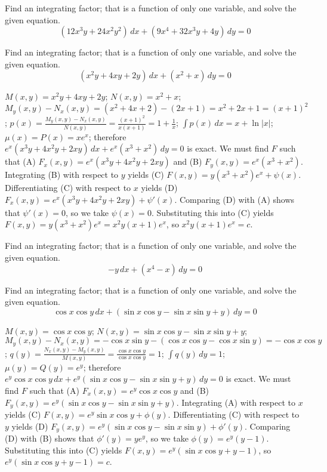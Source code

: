 \documentclass{ximera}
\begin{document}
\begin{problem}\label{exer:2.6.11} Find an integrating factor; that is a function of only one variable, and solve the given equation.
$$(12x^3y+24x^2y^2)\,dx+(9x^4+32x^3y+4y)\,dy=0$$
\end{problem}

\begin{problem}\label{exer:2.6.12} Find an integrating factor; that is a function of only one variable, and solve the given equation.
$$(x^2y+4xy+2y)\,dx+(x^2+x)\,dy=0$$



\begin{solution}
    $M(x,y)=x^2y+4xy+2y$;\;
$N(x,y)=x^2+x$;\;
$M_y(x,y)-N_x(x,y)=(x^2+4x+2)-(2x+1)=x^2+2x+1=(x+1)^2$;\;
$p(x)=\frac{M_y(x,y)-N_x(x,y)}{ N(x,y)}=\frac{(x+1)^2}{
x(x+1)}=1+\frac{1}{ x}$;\;
$\int p(x)\,dx=x+\ln|x|$;\;
$\mu(x)=P(x)=xe^x$;
therefore
$e^x(x^3y+4x^2y+2xy)\,dx+e^x(x^3+x^2)\,dy=0$
is exact.
We must find $F$ such that
(A) $F_x(x,y)=e^x(x^3y+4x^2y+2xy)$ and
(B) $F_y(x,y)=e^x(x^3+x^2)$.
Integrating (B) with respect to $y$ yields
(C) $F(x,y)=y(x^3+x^2)e^x+\psi(x)$.
Differentiating (C) with respect to $x$  yields
(D) $F_x(x,y)=e^x(x^3y+4x^2y+2xy)+\psi'(x)$.
Comparing (D) with (A)  shows that
$\psi'(x)=0$, so we take
$\psi(x)=0$.
Substituting this into (C) yields
$F(x,y)=y(x^3+x^2)e^x=x^2y(x+1)e^x$,
so $x^2y(x+1)e^x=c$.
\end{solution}
\end{problem}

\begin{problem}\label{exer:2.6.13} Find an integrating factor; that is a function of only one variable, and solve the given equation.
$$-y\,dx+(x^4-x)\,dy=0$$
\end{problem}

\begin{problem}\label{exer:2.6.14} Find an integrating factor; that is a function of only one variable, and solve the given equation.
$$\cos x\cos y\,dx+(\sin x\cos y-\sin x\sin y+y)\,dy=0$$



\begin{solution}
    $M(x,y)=\cos x\cos y$;\;
$N(x,y)=\sin x\cos y-\sin x\sin y+y$;\;
$M_y(x,y)-N_x(x,y)=-\cos x\sin y-(\cos x\cos y-\cos x\sin y)
=-\cos x\cos y$;\;
$q(y)=\frac{N_x(x,y)-M_y(x,y)}{ M(x,y)}=\frac{\cos x\cos y
}{\cos x\cos y}=1$;\;
$\int q(y)\,dy=1$;\;
$\mu(y)=Q(y)=e^y$;
therefore
$e^y\cos x\cos y\,dx+e^y(\sin x\cos y-\sin x\sin y+y)\,dy=0$
is exact.
We must find $F$ such that
(A) $F_x(x,y)=e^y\cos x\cos y$ and
(B) $F_y(x,y)=e^y(\sin x\cos y-\sin x\sin y+y)$.
Integrating (A) with respect to $x$ yields
(C) $F(x,y)=e^y\sin x\cos y+\phi(y)$.
Differentiating (C) with respect to $y$  yields
(D) $F_y(x,y)=e^y(\sin x\cos y-\sin x\sin y)+\phi'(y)$.
Comparing (D) with (B)  shows that
$\phi'(y)=ye^y$, so we take
$\phi(y)=e^y(y-1)$.
Substituting this into (C) yields
$F(x,y)=e^y(\sin x\cos y+y-1)$,
so $e^y(\sin x\cos y+y-1)=c$.
\end{solution}
\end{problem}
\end{document}
